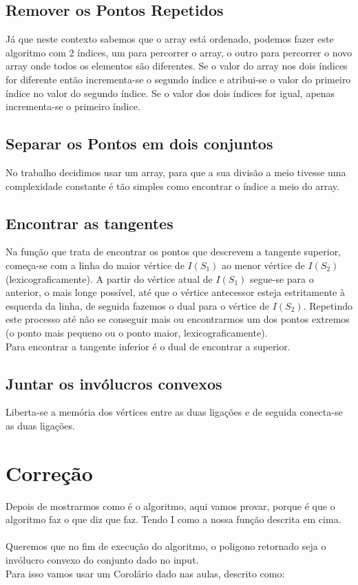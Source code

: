 \documentclass[11pt]{article}
\begin{document}
\subsection{ Remover os Pontos Repetidos }
Já que neste contexto sabemos que o array está ordenado,
podemos fazer este algoritmo com 2 índices, um para percorrer
o array, o outro para percorrer o novo array onde todos os 
elementos são diferentes. Se o valor do array nos dois índices for
diferente então incrementa-se o segundo índice e atribui-se
o valor do primeiro índice no valor do segundo índice. Se o 
valor dos dois índices for igual, apenas incrementa-se o
primeiro índice.

\subsection{ Separar os Pontos em dois conjuntos }
No trabalho decidimos usar um array, para que a sua divisão a meio 
tivesse uma complexidade constante é tão simples como encontrar o 
índice a meio do array.

\subsection{ Encontrar as tangentes } \label{tangentes}
Na função que trata de encontrar os pontos que 
descrevem a tangente superior, começa-se com a linha
do maior vértice de $I(S_1)$ ao menor vértice de $I(S_2)$ (lexicograficamente).
A partir do vértice atual de $I(S_1)$ segue-se para o anterior, o mais 
longe possível, até que o vértice antecessor esteja estritamente à
esquerda da linha, de seguida fazemos o dual para o vértice de $I(S_2)$.
Repetindo este processo até não se conseguir mais ou encontrarmos
um dos pontos extremos (o ponto mais pequeno ou o ponto maior,
lexicograficamente).\\

Para encontrar a tangente inferior é o dual de encontrar
a superior.

\subsection{ Juntar os invólucros convexos } 
Liberta-se a memória dos vértices entre as duas ligações e de seguida 
conecta-se as duas ligações.


\section{Correção}
Depois de mostrarmos como é o algoritmo,
aqui vamos provar, porque é que o algoritmo faz o que diz que faz.
Tendo I como a nossa função descrita em cima.\\
\\
Queremos que no fim de execução do algoritmo, o poligono
retornado seja o invólucro convexo do conjunto dado 
no input.\\
Para isso vamos usar um Corolário dado nas aulas, descrito como:
\end{document}
